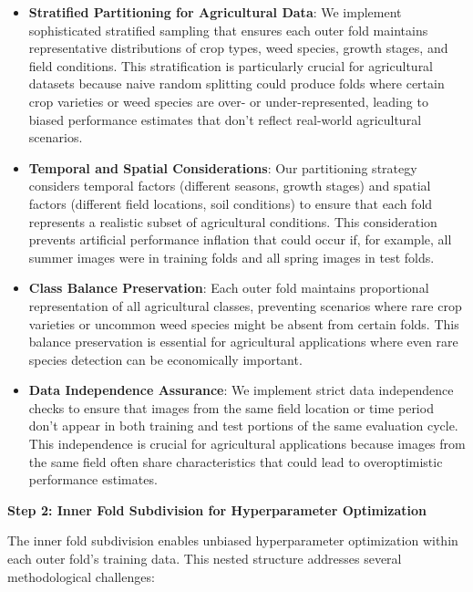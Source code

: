 \begin{itemize}
    \item \textbf{Stratified Partitioning for Agricultural Data}: We implement sophisticated stratified sampling that ensures each outer fold maintains representative distributions of crop types, weed species, growth stages, and field conditions. This stratification is particularly crucial for agricultural datasets because naive random splitting could produce folds where certain crop varieties or weed species are over- or under-represented, leading to biased performance estimates that don't reflect real-world agricultural scenarios.
    
    \item \textbf{Temporal and Spatial Considerations}: Our partitioning strategy considers temporal factors (different seasons, growth stages) and spatial factors (different field locations, soil conditions) to ensure that each fold represents a realistic subset of agricultural conditions. This consideration prevents artificial performance inflation that could occur if, for example, all summer images were in training folds and all spring images in test folds.
    
    \item \textbf{Class Balance Preservation}: Each outer fold maintains proportional representation of all agricultural classes, preventing scenarios where rare crop varieties or uncommon weed species might be absent from certain folds. This balance preservation is essential for agricultural applications where even rare species detection can be economically important.
    
    \item \textbf{Data Independence Assurance}: We implement strict data independence checks to ensure that images from the same field location or time period don't appear in both training and test portions of the same evaluation cycle. This independence is crucial for agricultural applications because images from the same field often share characteristics that could lead to overoptimistic performance estimates.
\end{itemize}

\textbf{Step 2: Inner Fold Subdivision for Hyperparameter Optimization}

The inner fold subdivision enables unbiased hyperparameter optimization within each outer fold's training data. This nested structure addresses several methodological challenges:

